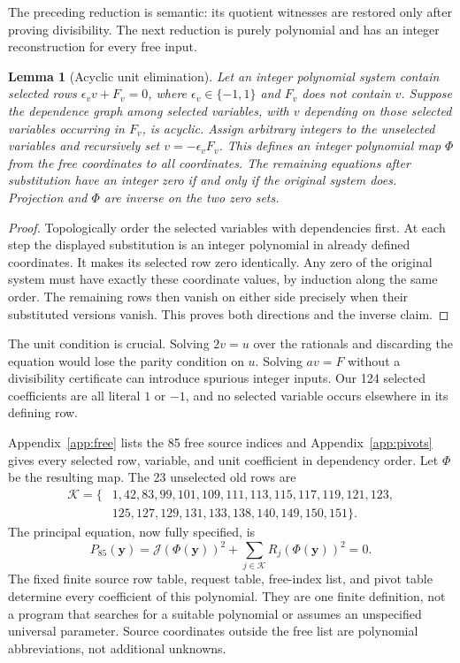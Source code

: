 \documentclass[11pt]{article}
\newtheorem{lemma}[theorem]{Lemma}
\theoremstyle{definition}\newtheorem{definition}[theorem]{Definition}
\theoremstyle{remark}\newtheorem{remark}[theorem]{Remark}
\begin{document}
The preceding reduction is semantic: its quotient witnesses are
restored only after proving divisibility. The next reduction is purely
polynomial and has an integer reconstruction for every free input.

\begin{lemma}[Acyclic unit elimination]
\label{lem:eliminate}
Let an integer polynomial system contain selected rows
$\epsilon_v v+F_v=0$, where $\epsilon_v\in\{-1,1\}$ and $F_v$
does not contain $v$. Suppose the dependence graph among selected
variables, with $v$ depending on those selected variables occurring in
$F_v$, is acyclic. Assign arbitrary integers to the unselected variables
and recursively set $v=-\epsilon_v F_v$. This defines an integer
polynomial map $\Phi$ from the free coordinates to all coordinates.
The remaining equations after substitution have an integer zero if
and only if the original system does. Projection and $\Phi$ are
inverse on the two zero sets.
\end{lemma}
\begin{proof}
Topologically order the selected variables with dependencies first.
At each step the displayed substitution is an integer polynomial in
already defined coordinates. It makes its selected row zero
identically. Any zero of the original system must have exactly these
coordinate values, by induction along the same order. The remaining
rows then vanish on either side precisely when their substituted
versions vanish. This proves both directions and the inverse claim.
\end{proof}

The unit condition is crucial. Solving $2v=u$ over the rationals and
discarding the equation would lose the parity condition on $u$.
Solving $av=F$ without a divisibility certificate can introduce
spurious integer inputs. Our 124 selected coefficients are all
literal $1$ or $-1$, and no selected variable occurs elsewhere in
its defining row.

Appendix~\ref{app:free} lists the 85 free source indices and
Appendix~\ref{app:pivots} gives every selected row, variable, and
unit coefficient in dependency order. Let $\Phi$ be the resulting
map. The 23 unselected old rows are
\begin{equation}
 \begin{split}
 \mathcal K=\{&1,42,83,99,101,109,111,113,115,117,119,121,123,\\
              &125,127,129,131,133,138,140,149,150,151\}.
 \end{split}
 \label{eq:K}
\end{equation}
The principal equation, now fully specified, is
\begin{equation}
 \boxed{P_{85}(\boldsymbol y)=
       \mathcal J(\Phi(\boldsymbol y))^2+
       \sum_{j\in\mathcal K}R_j(\Phi(\boldsymbol y))^2=0.}
 \label{eq:85}
\end{equation}
The fixed finite source row table, request table, free-index list, and
pivot table determine every coefficient of this polynomial. They are
one finite definition, not a program that searches for a suitable
polynomial or assumes an unspecified universal parameter. Source
coordinates outside the free list are polynomial abbreviations, not
additional unknowns.
\end{document}
